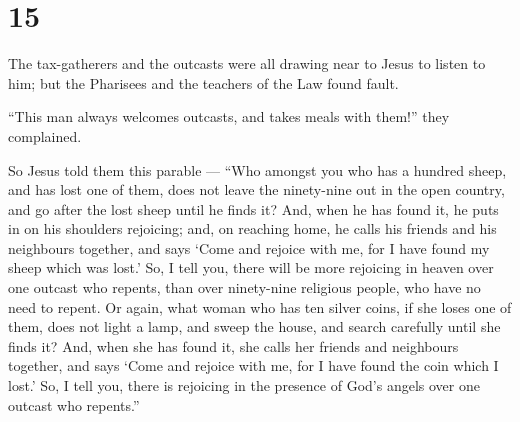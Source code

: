 \hypertarget{section-13}{%
\section{15}\label{section-13}}

 The tax-gatherers and the outcasts were all drawing near to
Jesus to listen to him;  but the Pharisees and the teachers
of the Law found fault.

``This man always welcomes outcasts, and takes meals with them!'' they
complained.

 So Jesus told them this parable ---  ``Who
amongst you who has a hundred sheep, and has lost one of them, does not
leave the ninety-nine out in the open country, and go after the lost
sheep until he finds it?  And, when he has found it, he puts
in on his shoulders rejoicing;  and, on reaching home, he
calls his friends and his neighbours together, and says `Come and
rejoice with me, for I have found my sheep which was lost.' 
So, I tell you, there will be more rejoicing in heaven over one outcast
who repents, than over ninety-nine religious people, who have no need to
repent.  Or again, what woman who has ten silver coins, if
she loses one of them, does not light a lamp, and sweep the house, and
search carefully until she finds it?  And, when she has
found it, she calls her friends and neighbours together, and says `Come
and rejoice with me, for I have found the coin which I lost.'
 So, I tell you, there is rejoicing in the presence of
God's angels over one outcast who repents.''

